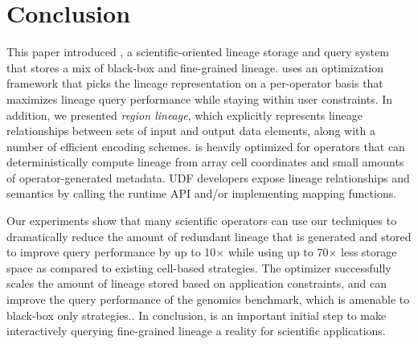 \section{Conclusion}

This paper introduced \sys{}, a scientific-oriented lineage storage and query
system that stores a mix of black-box and fine-grained lineage.  \sys{} uses an
optimization framework that picks the lineage representation on a per-operator
basis that maximizes lineage query performance while staying within user
constraints.  In addition, we presented {\it region lineage}, which explicitly
represents lineage relationships between sets of input and output data
elements, along with a number of efficient encoding schemes.  \sys{} is heavily
optimized for operators that can deterministically compute lineage from array
cell coordinates and small amounts of operator-generated metadata.  UDF
developers expose  lineage relationships and semantics by calling the runtime
API and/or implementing mapping functions.

Our experiments show that many scientific operators can use our techniques to
dramatically reduce the amount of redundant lineage that is generated and
stored to  improve query performance by up to 10$\times$ while using up to
70$\times$ less storage space as compared to existing cell-based strategies.
The optimizer successfully scales the amount of lineage stored based on
application constraints, and can improve the query performance of the genomics
benchmark, which is amenable to black-box only strategies..  In conclusion,
\sys{} is an important initial step to make interactively querying 
fine-grained lineage a reality for scientific applications.




